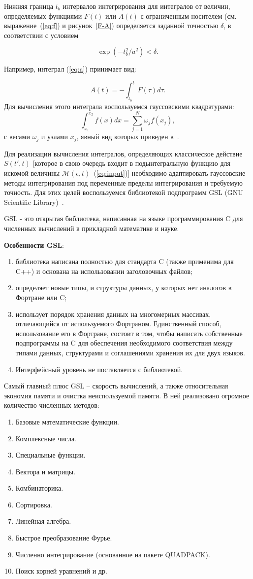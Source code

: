 \documentclass[14pt, a4paper]{article}
\numberwithin{figure}{section}
\numberwithin{equation}{section}
\newcommand{\cM}{\mathcal{M}}
\begin{document}
Нижняя граница $t_b$ интервалов интегрирования для интегралов от величин, определяемых функциями $F(t)$ или $A(t)$ с ограниченным носителем (см. выражение~(\ref{eq:f}) и рисунок~\ref{F-A}) определяется заданной точностью $\delta$, в соответствии с условием

$$
\exp( -t_b^2/a^2) < \delta.
$$

Например, интеграл (\ref{eq:a}) принимает вид:

$$\label{eq:easy}
A(t) = -\int_{t_b}^{t} F(\tau) d\tau.
$$
Для вычисления этого интеграла воспользуемся гауссовскими квадратурами:
$$
\int_{x_1}^{x_2} f(x) dx = \sum_{j=1}^{N} \omega_j f(x_j),
$$
с весами $\omega_j$ и узлами $x_j$, явный вид которых приведен в~\cite{spec}. 

Для реализации вычисления интегралов, определяющих классическое действие $S(t',t)$ [которое в свою очередь входит в подынтегральную функцию для искомой величины $\cM(\epsilon,t)$~(\ref{eq:input})] необходимо адаптировать гауссовские методы интегрирования под переменные пределы интегрирования и требуемую точность.  Для этих целей воспользуемся библиотекой подпрограмм GSL (GNU Scientific Library)~\cite{gsl:website}. 

GSL - это открытая библиотека, написанная на языке программирования C для численных вычислений в прикладной математике и науке.

\textbf{Особенности GSL}: 
\begin{enumerate}
\item библиотека написана полностью для стандарта C (также применима для C++) и основана на использовании заголовочных файлов;
\item определяет новые типы, и структуры данных, у которых нет аналогов в Фортране или C;
\item использует порядок хранения данных на многомерных массивах, отличающийся от используемого Фортраном. 
Единственный способ, использование его в Фортране, состоит в том, чтобы написать собственные подпрограммы на C для обеспечения необходимого соответствия между типами данных, структурами и соглашениями хранения их для двух языков.
\item Интерфейсный уровень не поставляется с библиотекой. 
\end{enumerate}
Самый главный плюс GSL -- скорость вычислений, а также относительная экономия памяти и очистка неиспользуемой памяти. В ней реализовано огромное количество численных методов:
\begin{enumerate} 
	\item Базовые математические функции.
	\item Комплексные числа.
	\item Специальные функции.
	\item Вектора и матрицы.
	\item Комбинаторика.
	\item Сортировка.
	\item Линейная алгебра.
	\item Быстрое преобразование Фурье.
	\item Численно интегрирование (основанное на пакете QUADPACK).
	\item Поиск корней уравнений и др.
\end{enumerate}
\end{document}
